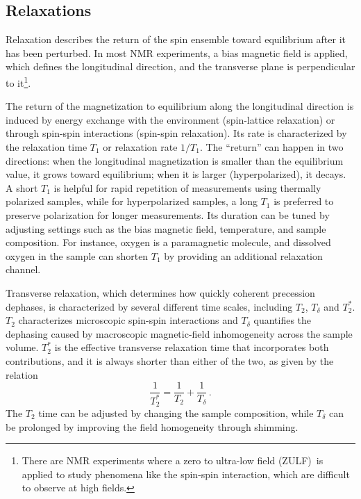 \subsection{Relaxations}\label{sec:intro:NMR:relaxation}

Relaxation describes the return of the spin ensemble toward equilibrium after it has been perturbed.
In most NMR experiments, a bias magnetic field is applied, which defines the longitudinal direction, and the transverse plane is perpendicular to it\footnote{There are NMR experiments where a zero to ultra-low field (ZULF)\,\cite{Barskiy2025_ZULFNMRreview} is applied to study phenomena like the spin-spin interaction, which are difficult to observe at high fields.}.


The return of the magnetization to equilibrium along the longitudinal direction is induced by energy exchange with the environment (spin-lattice relaxation) or through spin-spin interactions (spin-spin relaxation).
Its rate is characterized by the relaxation time $T_1$ or relaxation rate $1/T_1$.
The ``return'' can happen in two directions: when the longitudinal magnetization is smaller than the equilibrium value, it grows toward equilibrium; when it is larger (hyperpolarized), it decays.
A short $T_1$ is helpful for rapid repetition of measurements using thermally polarized samples, while for hyperpolarized samples, a long $T_1$ is preferred to preserve polarization for longer measurements.
Its duration can be tuned by adjusting settings such as the bias magnetic field, temperature, and sample composition.
For instance, oxygen is a paramagnetic molecule, and dissolved oxygen in the sample can shorten $T_1$ by providing an additional relaxation channel.



Transverse relaxation, which determines how quickly coherent precession dephases, is characterized by several different time scales, including $T_2$, $T_\delta$ and $T_2^*$.
$T_2$ characterizes microscopic spin-spin interactions and $T_\delta$ quantifies the dephasing caused by macroscopic magnetic-field inhomogeneity across the sample volume.
$T_2^*$ is the effective transverse relaxation time that incorporates both contributions, and it is always shorter than either of the two, as given by the relation
\begin{equation}
    \frac{1}{T_2^*} = \frac{1}{T_2} + \frac{1}{T_\delta}
    \,.\label{eq:T2star}
\end{equation}
The $T_2$ time can be adjusted by changing the sample composition, while $T_\delta$ can be prolonged by improving the field homogeneity through shimming.

